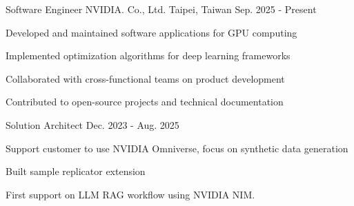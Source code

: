

\begin{cventries}

  \cventry
    {Software Engineer} %
    {NVIDIA. Co., Ltd.} %
    {Taipei, Taiwan} %
    {Sep. 2025 - Present} %
    {
      \begin{cvitems} %
        \item {Developed and maintained software applications for GPU computing}
        \item {Implemented optimization algorithms for deep learning frameworks}
        \item {Collaborated with cross-functional teams on product development}
        \item {Contributed to open-source projects and technical documentation}
      \end{cvitems}
    }

  \cventry
    {Solution Architect} %
    {} %
    {} %
    {Dec. 2023 - Aug. 2025} %
    {
      \begin{cvitems} %
        \item {Support customer to use NVIDIA Omniverse, focus on synthetic data generation}
        \item {Built sample replicator extension}
        \item {First support on LLM RAG workflow using NVIDIA NIM.}
      \end{cvitems}
    }
\end{cventries}
